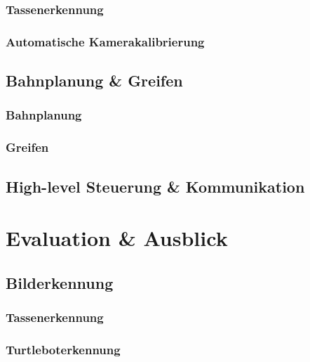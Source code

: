 \documentclass[de,ids]{fziartcl}
\begin{document}
\subsubsection{Tassenerkennung}
\label{4-1-1_gesamtsystem_bilderkennung_tassenerkennung}
\subsubsection{Automatische Kamerakalibrierung}
\subsection{Bahnplanung \& Greifen}
\subsubsection{Bahnplanung}
\subsubsection{Greifen}
\subsection{High-level Steuerung \& Kommunikation}

\section{Evaluation \& Ausblick} %
\subsection{Bilderkennung}
\subsubsection{Tassenerkennung}
\subsubsection{Turtleboterkennung}
\end{document}

